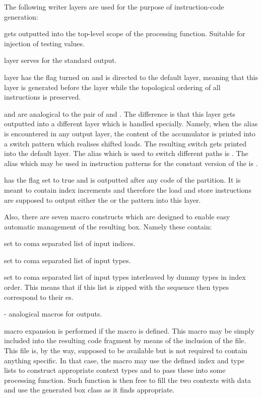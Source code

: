     The following writer layers are used for the purpose of instruction-code generation:
    \begin{description}
      \item {} gets outputted into the top-level scope of the processing function. Suitable for injection of testing values.
      \item {} layer serves for the standard output.
      \item {} layer has the  flag turned on and is directed to the default layer, meaning that this layer is generated before the  layer while the topological ordering of all instructions is preserved.
      \item {} and  are analogical to the pair of  and . The difference is that this layer gets outputted into a different layer which is handled specially. Namely, when the  alias is encountered in any output layer, the content of the accumulator is printed into a switch pattern which realises shifted loads. The resulting switch gets printed into the default layer. The alias which is used to switch different paths is . The alias which may be used in instruction patterns for the constant version of the  is .
      \item {} has the  flag set to true and is outputted after any code of the partition. It is meant to contain index increments and therefore the load and store instructions are supposed to output either the  or the  pattern into this layer. 
    \end{description}

Also, there are seven macro constructs which are designed to enable easy automatic management of the resulting box. Namely these contain:
\begin{description}
  \item {} set to coma separated list of input indices.
  \item {} set to coma separated list of input types.
  \item {} set to coma separated list of input types interleaved by dummy types in index order. This means that if this list is zipped with the sequence  then types correspond to their es.
  \item {} - analogical macros for outputs.
  \item {} macro expansion is performed if the macro is defined. This macro may be simply included into the resulting code fragment by means of the inclusion of the  file. This file is, by the way, supposed to be available but is not required to contain anything specific. In that case, the macro may use the defined index and type lists to construct appropriate context types and to pass these into some processing function. Such function is then free to fill the two contexts with data and use the generated box class as it finds appropriate. 
\end{description}

